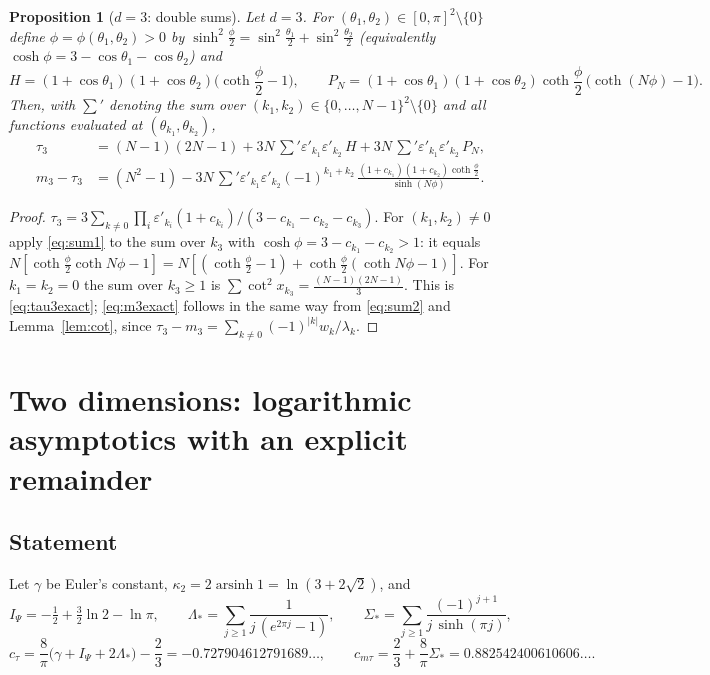 \documentclass[11pt,a4paper]{article}
\theoremstyle{plain}
\newtheorem{proposition}[theorem]{Proposition}
\theoremstyle{definition}
\numberwithin{equation}{section}
\begin{document}
\begin{proposition}[$d=3$: double sums]\label{prop:d3exact}
Let $d=3$. For $(\theta_1,\theta_2)\in[0,\pi]^2\setminus\{0\}$ define $\phi=\phi(\theta_1,\theta_2)>0$ by $\sinh^2\frac\phi2=\sin^2\frac{\theta_1}2+\sin^2\frac{\theta_2}2$ (equivalently $\cosh\phi=3-\cos\theta_1-\cos\theta_2$) and
\begin{equation}\label{eq:HP}
H=(1+\cos\theta_1)(1+\cos\theta_2)\Big(\coth\frac\phi2-1\Big),\qquad P_N=(1+\cos\theta_1)(1+\cos\theta_2)\coth\frac\phi2\,\big(\coth(N\phi)-1\big).
\end{equation}
Then, with $\sum'$ denoting the sum over $(k_1,k_2)\in\{0,\dots,N-1\}^2\setminus\{0\}$ and all functions evaluated at $(\theta_{k_1},\theta_{k_2})$,
\begin{align}
\tau_3&=(N-1)(2N-1)+3N\,{\sum}'\varepsilon'_{k_1}\varepsilon'_{k_2}\,H+3N\,{\sum}'\varepsilon'_{k_1}\varepsilon'_{k_2}\,P_N,\label{eq:tau3exact}\\
m_3-\tau_3&=(N^2-1)-3N\,{\sum}'\varepsilon'_{k_1}\varepsilon'_{k_2}(-1)^{k_1+k_2}\,\frac{(1+c_{k_1})(1+c_{k_2})\coth\frac\phi2}{\sinh(N\phi)}.\label{eq:m3exact}
\end{align}
\end{proposition}
\begin{proof}
$\tau_3=3\sum_{k\ne0}\prod_i\varepsilon'_{k_i}(1+c_{k_i})/(3-c_{k_1}-c_{k_2}-c_{k_3})$. For $(k_1,k_2)\ne0$ apply \eqref{eq:sum1} to the sum over $k_3$ with $\cosh\phi=3-c_{k_1}-c_{k_2}>1$: it equals $N[\coth\frac\phi2\coth N\phi-1]=N[(\coth\frac\phi2-1)+\coth\frac\phi2(\coth N\phi-1)]$. For $k_1=k_2=0$ the sum over $k_3\ge1$ is $\sum\cot^2x_{k_3}=\frac{(N-1)(2N-1)}3$. This is \eqref{eq:tau3exact}; \eqref{eq:m3exact} follows in the same way from \eqref{eq:sum2} and Lemma~\ref{lem:cot}, since $\tau_3-m_3=\sum_{k\ne0}(-1)^{|k|}w_k/\lambda_k$.
\end{proof}

\section{Two dimensions: logarithmic asymptotics with an explicit remainder}\label{sec:d2}

\subsection{Statement}
Let $\gamma$ be Euler's constant, $\kappa_2=2\operatorname{arsinh}1=\ln(3+2\sqrt2)$, and
\begin{equation}\label{eq:consts2}
I_\Psi=-\tfrac12+\tfrac32\ln2-\ln\pi,\qquad
\Lambda_*=\sum_{j\ge1}\frac{1}{j\,(e^{2\pi j}-1)},\qquad \Sigma_*=\sum_{j\ge1}\frac{(-1)^{j+1}}{j\,\sinh(\pi j)},
\end{equation}
\begin{equation}\label{eq:ctau}
c_\tau=\frac8\pi\big(\gamma+I_\Psi+2\Lambda_*\big)-\frac23=-0.727904612791689\ldots,\qquad
c_{m\tau}=\frac23+\frac8\pi\Sigma_*=0.882542400610606\ldots .
\end{equation}
\end{document}
